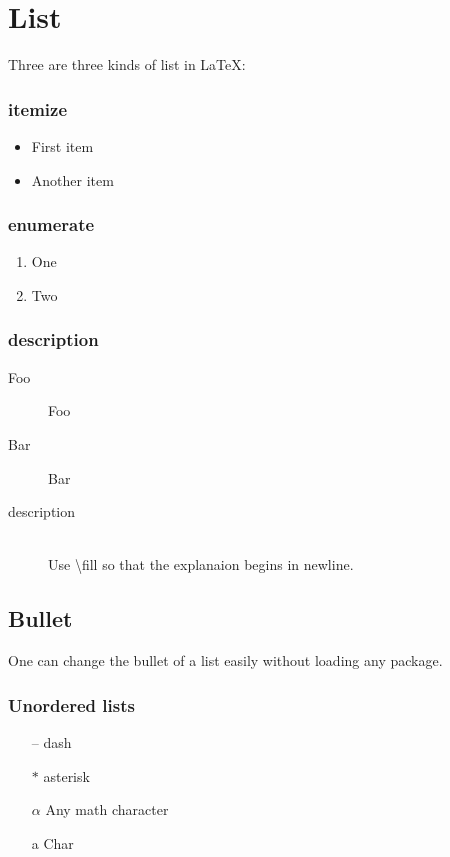 \section{List}
Three are three kinds of list in \LaTeX{}: 

\subsubsection{itemize}
\begin{itemize}
    \item First item
    \item Another item
\end{itemize}

\subsubsection{enumerate}
\begin{enumerate}
    \item One
    \item Two
\end{enumerate}

\subsubsection{description}
\begin{description}
    \item[Foo] Foo 
    \item[Bar] Bar
    \item[description] \hfill \\
	Use \textbackslash{fill} so that the explanaion begins in newline.
\end{description}

\subsection{Bullet}
One can change the bullet of a list easily without loading any package.

\subsubsection{Unordered lists}
\begin{itemize}
    \item[--] dash
    \item[$\ast$] asterisk
    \item[$\alpha$] Any math character
    \item[a] Char
\end{itemize}

